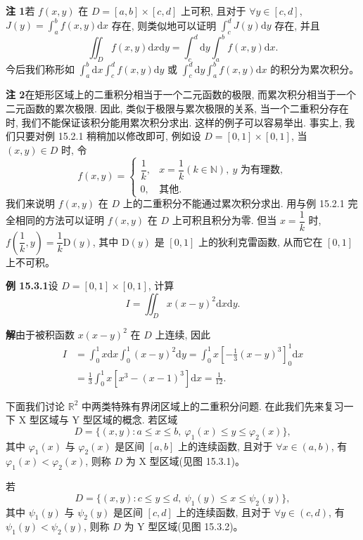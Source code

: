 \documentclass[UTF8,12pt,a4paper,fontset=fandol]{ctexart}
\begin{document}
\noindent\textbf{注 1}\quad 若 $f(x,y)$ 在 $D=[a,b]\times[c,d]$ 上可积, 且对于 $\forall y\in[c,d]$, $J(y)=\int_a^b f(x,y)\mathrm dx$ 存在, 则类似地可以证明 $\int_c^d J(y)\mathrm dy$ 存在, 并且
\[
  \iint_D f(x,y)\mathrm dx\mathrm dy
  =
  \int_c^d\mathrm dy\int_a^b f(x,y)\mathrm dx.
\]
今后我们称形如 $\int_a^b\mathrm dx\int_c^d f(x,y)\mathrm dy$ 或 $\int_c^d\mathrm dy\int_a^b f(x,y)\mathrm dx$ 的积分为累次积分。

\noindent\textbf{注 2}\quad 在矩形区域上的二重积分相当于一个二元函数的极限, 而累次积分相当于一个二元函数的累次极限. 因此, 类似于极限与累次极限的关系, 当一个二重积分存在时, 我们不能保证该积分能用累次积分求出. 这样的例子可以容易举出. 事实上, 我们只要对例 15.2.1 稍稍加以修改即可, 例如设 $D=[0,1]\times[0,1]$, 当 $(x,y)\in D$ 时, 令
\[
  f(x,y)=
  \begin{cases}
    \dfrac1k, & x=\dfrac1k(k\in\mathbb N),\ y\text{ 为有理数},\\
    0, & \text{其他}.
  \end{cases}
\]
我们来说明 $f(x,y)$ 在 $D$ 上的二重积分不能通过累次积分求出. 用与例 15.2.1 完全相同的方法可以证明 $f(x,y)$ 在 $D$ 上可积且积分为零. 但当 $x=\dfrac1k$ 时, $f\left(\dfrac1k,y\right)=\dfrac1k\mathrm D(y)$, 其中 $\mathrm D(y)$ 是 $[0,1]$ 上的狄利克雷函数, 从而它在 $[0,1]$ 上不可积。

\noindent\textbf{例 15.3.1}\quad 设 $D=[0,1]\times[0,1]$, 计算
\[
  I=\iint_D x(x-y)^2\mathrm dx\mathrm dy.
\]

\noindent\textbf{解}\quad 由于被积函数 $x(x-y)^2$ 在 $D$ 上连续, 因此
\[
\begin{aligned}
  I
  &=\int_0^1 x\mathrm dx\int_0^1(x-y)^2\mathrm dy
    =\int_0^1 x\left[-\frac13(x-y)^3\right]_0^1\mathrm dx\\
  &=\frac13\int_0^1x[x^3-(x-1)^3]\mathrm dx
    =\frac1{12}.
\end{aligned}
\]

下面我们讨论 $\mathbb R^2$ 中两类特殊有界闭区域上的二重积分问题. 在此我们先来复习一下 X 型区域与 Y 型区域的概念. 若区域
\[
  D=\{(x,y):a\leqslant x\leqslant b,\ \varphi_1(x)\leqslant y\leqslant\varphi_2(x)\},
\]
其中 $\varphi_1(x)$ 与 $\varphi_2(x)$ 是区间 $[a,b]$ 上的连续函数, 且对于 $\forall x\in(a,b)$, 有 $\varphi_1(x)<\varphi_2(x)$, 则称 $D$ 为 X 型区域(见图 15.3.1)。

若
\[
  D=\{(x,y):c\leqslant y\leqslant d,\ \psi_1(y)\leqslant x\leqslant\psi_2(y)\},
\]
其中 $\psi_1(y)$ 与 $\psi_2(y)$ 是区间 $[c,d]$ 上的连续函数, 且对于 $\forall y\in(c,d)$, 有 $\psi_1(y)<\psi_2(y)$, 则称 $D$ 为 Y 型区域(见图 15.3.2)。
\end{document}
